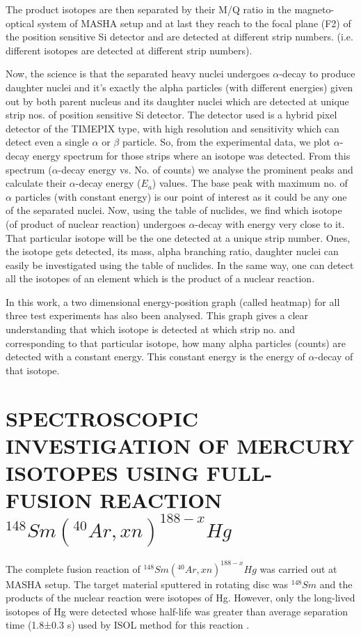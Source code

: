 \documentclass[12pt]{article}
\begin{document}
The product isotopes are then separated by their M/Q ratio in the magneto-optical system of MASHA setup and at last they reach to the focal plane (F2) of the position sensitive Si detector and are detected at different strip numbers. (i.e. different isotopes are detected at different strip numbers).

Now, the science is that the separated heavy nuclei undergoes
$\alpha$-decay to produce daughter nuclei and it's exactly the alpha particles (with different energies) given out by both parent nucleus and its daughter nuclei which are detected at unique strip nos. of position sensitive Si detector. The detector used is a hybrid pixel detector of the TIMEPIX type, with high resolution and sensitivity which can detect even a single $\alpha$ or $\beta$ particle. So, from the experimental data, we plot $\alpha$-decay energy spectrum for those strips where an isotope was detected. From this spectrum ($\alpha$-decay energy vs. No. of counts) we analyse the prominent peaks and calculate their $\alpha$-decay energy ($E_a$) values. The base peak with maximum no. of $\alpha$ particles (with constant energy) is our point of interest as it could be any one of the separated nuclei. Now, using the table of nuclides, we find which isotope (of product of nuclear reaction) undergoes $\alpha$-decay with energy very close to it. That particular isotope will be the one detected at a unique strip number. Ones, the isotope gets detected, its mass, alpha branching ratio, daughter nuclei can easily be investigated using the table of nuclides. In the same way, one can detect all the isotopes of an element which is the product of a nuclear reaction.

In this work, a two dimensional energy-position graph (called heatmap) for all three test experiments has also been analysed. This graph gives a clear understanding that which isotope is detected at which strip no. and corresponding to that particular isotope, how many alpha particles (counts) are detected with a constant energy. This constant energy is the energy of $\alpha$-decay of that isotope.


\section{SPECTROSCOPIC INVESTIGATION OF MERCURY ISOTOPES USING FULL-FUSION REACTION $^{148}Sm(^{40}Ar,xn)^{188-x}Hg$}
The complete fusion reaction of $^{148}Sm(^{40}Ar,xn)^{188-x}Hg$ was carried out at MASHA setup. The target material sputtered in rotating disc was $^{148}Sm$ and the products of the nuclear reaction were isotopes of Hg. However, only the long-lived isotopes of Hg were detected whose half-life was greater than average separation time (1.8±0.3 s) used by ISOL method for this reaction \cite{vedeneev2017current, rodin2014separation}.
\end{document}

